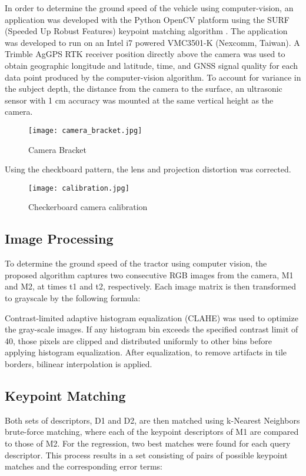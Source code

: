 In order to determine the ground speed of the vehicle using
computer-vision, an application was developed with the Python OpenCV
platform using the SURF (Speeded Up Robust Features) keypoint matching
algorithm \cite{bay}. The application was developed to run on an
Intel i7 powered VMC3501-K (Nexcomm, Taiwan). A Trimble AgGPS RTK
receiver position directly above the camera was used to obtain
geographic longitude and latitude, time, and GNSS signal quality for
each data point produced by the computer-vision algorithm. To account
for variance in the subject depth, the distance from the camera to the
surface, an ultrasonic sensor with 1 cm accuracy was mounted at the
same vertical height as the camera.

\begin{figure}
  \centering
  \texttt{[image: camera\_bracket.jpg]}
  \caption{Camera Bracket}
  \label{fig:camera_bracket}
\end{figure}

Using the checkboard pattern, the lens and projection distortion was corrected.
\begin{figure}
  \centering
  \texttt{[image: calibration.jpg]}
  \caption{Checkerboard camera calibration}
  \label{fig:calibration}
\end{figure}

\subsection{Image Processing}
To determine the ground speed of the tractor using computer vision,
the proposed algorithm captures two consecutive RGB images from the
camera, M1 and M2, at times t1 and t2, respectively. Each image matrix
is then transformed to grayscale by the following formula:

Contrast-limited adaptive histogram equalization (CLAHE) was used to
optimize the gray-scale images. If any histogram bin exceeds the
specified contrast limit of 40, those pixels are clipped and
distributed uniformly to other bins before applying histogram
equalization. After equalization, to remove artifacts in tile borders,
bilinear interpolation is applied.

\subsection{Keypoint Matching}
Both sets of descriptors, D1 and D2, are then matched using k-Nearest
Neighbors brute-force matching, where each of the keypoint descriptors
of M1 are compared to those of M2. For the regression, two best
matches were found for each query descriptor. This process results in
a set consisting of pairs of possible keypoint matches and the
corresponding error terms:


